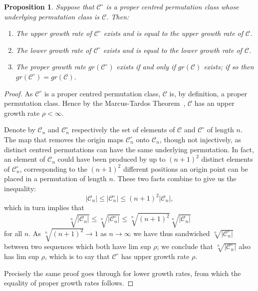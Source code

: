 \documentclass[11pt,a4paper]{article}
\newtheorem{prop}[thm]{Proposition}
\theoremstyle{definition}
\begin{document}
\begin{prop} \label{eqgrs}
Suppose that $\mathcal{C}^{\circ}$ is a proper centred permutation class whose underlying permutation class is $\mathcal{C}$. Then:
\begin{enumerate}
\item The upper growth rate of $\mathcal{C}^{\circ}$ exists and is equal to the upper growth rate of $\mathcal{C}$.
\item The lower growth rate of $\mathcal{C}^{\circ}$ exists and is equal to the lower growth rate of $\mathcal{C}$.
\item The proper growth rate $gr(\mathcal{C}^{\circ})$ exists if and only if $gr(\mathcal{C})$ exists; if so then $gr(\mathcal{C}^{\circ}) = gr(\mathcal{C})$.
\end{enumerate}
\end{prop}
\begin{proof}
As $\mathcal{C}^{\circ}$ is a proper centred permutation class, $\mathcal{C}$ is, by definition, a proper permutation class. Hence by the Marcus-Tardos Theorem~\cite{marcus:excluded-permut:}, $\mathcal{C}$ has an upper growth rate $\rho < \infty$. 

Denote by $\mathcal{C}_{n}$ and $\mathcal{C}^{\circ}_{n}$ respectively the set of elements of $\mathcal{C}$ and $\mathcal{C}^{\circ}$ of length $n$. The map that removes the origin maps $\mathcal{C}^{\circ}_{n}$ onto $\mathcal{C}_{n}$, though not injectively, as distinct centred permutations can have the same underlying permutation. In fact, an element of $\mathcal{C}_{n}$ could have been produced by up to $(n+1)^2$ distinct elements of $\mathcal{C}^{\circ}_{n}$, corresponding to the $(n+1)^2$ different positions an origin point can be placed in a permutation of length $n$. These two facts combine to give us the inequality:
\[
|\mathcal{C}_{n}| \leq |\mathcal{C}^{\circ}_{n}| \leq (n+1)^2 |\mathcal{C}_{n}|,
\]
which in turn implies that
\[
\sqrt[n]{|\mathcal{C}_{n}|} \leq \sqrt[n]{|\mathcal{C}^{\circ}_{n}|} \leq \sqrt[n]{(n+1)^2} \sqrt[n]{|\mathcal{C}_{n}|}
\]
for all $n$. As $\sqrt[n]{(n+1)^2} \rightarrow 1$ as $n \rightarrow \infty$ we have thus sandwiched $\sqrt[n]{|\mathcal{C}^{\circ}_{n}|}$ between two sequences which both have lim sup $\rho$; we conclude that $\sqrt[n]{|\mathcal{C}^{\circ}_{n}|}$ also has lim sup $\rho$, which is to say that $\mathcal{C}^{\circ}$ has upper growth rate $\rho$.

Precisely the same proof goes through for lower growth rates, from which the equality of proper growth rates follows.
\end{proof}
\end{document}
